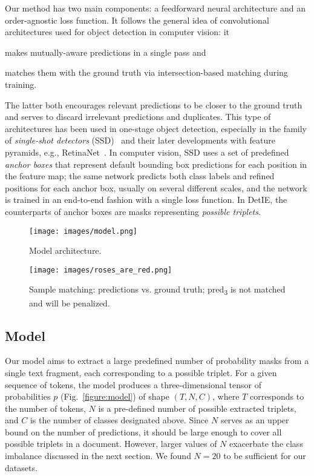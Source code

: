 \documentclass[letterpaper]{article} \usepackage{aaai22}  \usepackage{times}  \usepackage{helvet}  \usepackage{courier}  \usepackage[hyphens]{url}  \usepackage{graphicx} \usepackage{placeins}
\begin{document}
Our method has two main components: a feedforward neural architecture and an order-agnostic loss function. It follows the general idea of convolutional architectures used for object detection in computer vision: it
\begin{inparaenum}[(1)]
    \item makes mutually-aware predictions in a single pass and
    \item matches them with the ground truth via intersection-based matching during training.
\end{inparaenum}
The latter both encourages relevant predictions to be closer to the ground truth and serves to discard irrelevant predictions and duplicates.
This type of architectures has been used in one-stage object detection, especially in the family of \emph{single-shot detectors} (SSD)~\cite{SSD} and their later developments with feature pyramids, e.g., RetinaNet~\cite{lin2017focal}. In computer vision, SSD uses a set of predefined \emph{anchor boxes} that represent default bounding box predictions for each position in the feature map; the same network predicts both class labels and refined positions for each anchor box, usually on several different scales, and the network is trained in an end-to-end fashion with a single loss function. In DetIE, the counterparts of anchor boxes are masks representing \emph{possible triplets}.

\begin{figure}[!t]\centering
\texttt{[image: images/model.png]}
\caption{Model architecture.}\label{figure:model}

\texttt{[image: images/roses\_are\_red.png]}
\caption{Sample matching: predictions vs. ground truth; pred\textsubscript{3} is not matched and will be penalized. 
}\label{fig:bipartite}
\end{figure}

\subsection{Model}
Our model aims to extract a large predefined number of probability masks from a single text fragment, each corresponding to a possible triplet. For a given sequence of tokens, the model produces a three-dimensional tensor of probabilities $p$ (Fig.~\ref{figure:model}) of shape $(T, N, C)$, where $T$ corresponds to the number of tokens, $N$ is a pre-defined number of possible extracted triplets, and $C$ is the number of classes designated above. Since $N$ serves as an upper bound on the number of predictions, it should be large enough to cover all possible triplets in a document. However, larger values of $N$ exacerbate the class imbalance discussed in the next section. We found $N = 20$ to be sufficient for our datasets.
\end{document}
